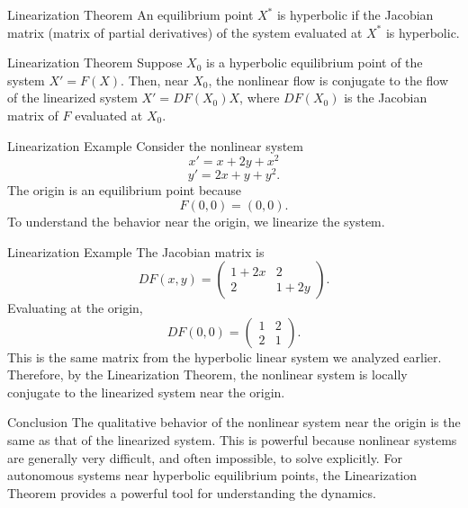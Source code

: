 \documentclass{beamer}
\begin{document}
\begin{frame}{Linearization Theorem}
    An equilibrium point $X^*$ is hyperbolic if the Jacobian matrix (matrix of partial derivatives) of the system evaluated at $X^*$ is hyperbolic.
    \begin{block}{Linearization Theorem}
        Suppose $X_0$ is a hyperbolic equilibrium point of the system $X' = F(X)$. Then, near $X_0$, the nonlinear flow is conjugate to the flow of the linearized system $X' = DF(X_0)X$, where $DF(X_0)$ is the Jacobian matrix of $F$ evaluated at $X_0$.
    \end{block}
\end{frame}

\begin{frame}{Linearization Example}
    Consider the nonlinear system
    \[
        x'=x+2y+x^2
    \]
    \[
        y'=2x+y+y^2.
    \]
    The origin is an equilibrium point because
    \[
        F(0,0)=(0,0).
    \]
    To understand the behavior near the origin, we linearize the system.
\end{frame}

\begin{frame}{Linearization Example}
    The Jacobian matrix is
    \[
        DF(x,y)=
        \begin{pmatrix}
            1+2x & 2 \\
            2 & 1+2y
        \end{pmatrix}.
    \]
    Evaluating at the origin,
    \[
        DF(0,0)=
        \begin{pmatrix}
            1 & 2 \\
            2 & 1
        \end{pmatrix}.
    \]
    This is the same matrix from the hyperbolic linear system we analyzed earlier. Therefore, by the Linearization Theorem, the nonlinear system is locally conjugate to the linearized system near the origin.
\end{frame}

\begin{frame}{Conclusion}
    The qualitative behavior of the nonlinear system near the origin is the same as that of the linearized system.
    \newline
    \newline
    This is powerful because nonlinear systems are generally very difficult, and often impossible, to solve explicitly.
    \newline
    \newline
    For autonomous systems near hyperbolic equilibrium points, the Linearization Theorem provides a powerful tool for understanding the dynamics.
\end{frame}
\end{document}

